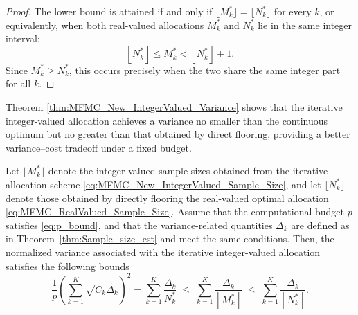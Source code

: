 \begin{proof}
The lower bound is attained if and only if $\lfloor M_k^* \rfloor = \lfloor N_k^* \rfloor$ for every $k$, or equivalently, when both real-valued allocations $M_k^*$ and $N_k^*$ lie in the same integer interval:
\[
\left\lfloor N_k^*\right\rfloor\le M_k^* < \left\lfloor N_k^*\right\rfloor + 1.
\]
Since $M_k^* \ge N_k^*$, this occurs precisely when the two share the same integer part for all $k$.
\end{proof}



Theorem \ref{thm:MFMC_New_IntegerValued_Variance} shows that the iterative integer-valued allocation achieves a variance no smaller than the continuous optimum but no greater than that obtained by direct flooring, providing a better variance–cost tradeoff under a fixed budget.

\begin{theorem}
\label{thm:MFMC_New_IntegerValued_Variance}

Let $\lfloor M_k^* \rfloor$ denote the integer-valued sample sizes obtained from the iterative allocation scheme \eqref{eq:MFMC_New_IntegerValued_Sample_Size}, and let $\lfloor N_k^* \rfloor$ denote those obtained by directly flooring the real-valued optimal allocation \eqref{eq:MFMC_RealValued_Sample_Size}. 
Assume that the computational budget $p$ satisfies \eqref{eq:p_bound}, and that the variance-related quantities $\Delta_k$ are defined as in Theorem~\ref{thm:Sample_size_est} and meet the same conditions. 
Then, the normalized variance associated with the iterative integer-valued allocation satisfies the following bounds
%
\begin{equation}\label{eq:Iterative_Integer_Variance_Bound}
\frac{1}{p}\left(\sum_{k=1}^K \sqrt{C_k \Delta_k}\right)^2
= \sum_{k=1}^K \frac{\Delta_k}{N_k^*}
\;\le\;
\sum_{k=1}^K \frac{\Delta_k}{\left\lfloor M_k^* \right\rfloor}
\;\le\;
\sum_{k=1}^K \frac{\Delta_k}{\left\lfloor N_k^* \right\rfloor}.
\end{equation}
%
\end{theorem}




